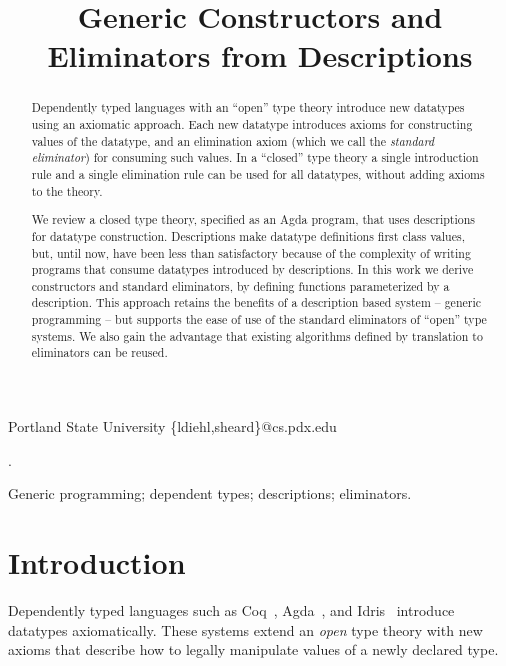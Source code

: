 \documentclass[preprint,nonatbib]{sigplanconf}
\begin{document}
\setlength{\pdfpageheight}{\paperheight}
\setlength{\pdfpagewidth}{\paperwidth}


\title{Generic Constructors and Eliminators from Descriptions}

           {Portland State University}
           {\{ldiehl,sheard\}@cs.pdx.edu}

\maketitle

\begin{abstract}
Dependently typed languages with an ``open'' type theory
introduce new datatypes using an axiomatic approach.
Each new datatype introduces axioms for constructing values
of the datatype, and an elimination axiom (which we call
the {\it standard eliminator}) for consuming such values. In a ``closed''
type theory a single introduction rule and a single
elimination rule can be used for all datatypes, without adding axioms
to the theory.

We review a closed type theory, specified as an Agda program, that
uses descriptions for datatype construction.
Descriptions make datatype definitions first class values, but, until now,
have been less than satisfactory because of the complexity of writing
programs that consume datatypes introduced by descriptions. In this
work we derive constructors and standard eliminators, by defining functions
parameterized by a description. This approach retains the benefits of
a description based system -- generic programming -- but supports
the ease of use of the standard eliminators of ``open'' type systems.
We also gain the advantage that existing algorithms
defined by translation to eliminators can be reused.

\end{abstract}

.

\keywords
Generic programming; dependent types; descriptions; eliminators.

\section{Introduction}
\label{sec:intro}
Dependently typed languages such as
{\sc Coq}~\citep{coq08},
{\sc Agda}~\citep{norell2007towards}, and 
{\sc Idris}~\citep{brady2011idris} 
introduce datatypes axiomatically.
These systems extend an {\it open} type theory with new axioms that
describe how to legally manipulate values of a newly declared type.
\end{document}
